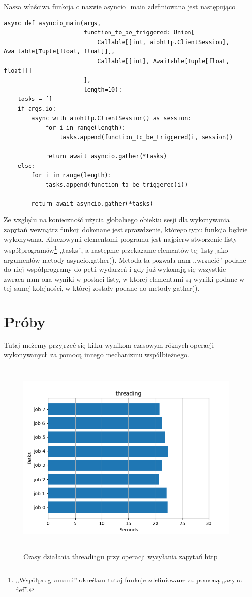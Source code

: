 Nasza właściwa funkcja o nazwie asyncio\_main zdefiniowana jest następująco:
\begin{lstlisting}
async def asyncio_main(args,
                       function_to_be_triggered: Union[
                           Callable[[int, aiohttp.ClientSession], Awaitable[Tuple[float, float]]],
                           Callable[[int], Awaitable[Tuple[float, float]]]
                       ],
                       length=10):
    tasks = []
    if args.io:
        async with aiohttp.ClientSession() as session:
            for i in range(length):
                tasks.append(function_to_be_triggered(i, session))

            return await asyncio.gather(*tasks)
    else:
        for i in range(length):
            tasks.append(function_to_be_triggered(i))

        return await asyncio.gather(*tasks)
\end{lstlisting}
Ze względu na konieczność użycia globalnego obiektu sesji dla wykonywania zapytań wewnątrz funkcji dokonane jest sprawdzenie, którego typu funkcja będzie wykonywana. Kluczowymi elementami programu jest najpierw stworzenie listy współprogramów\footnote{,,Współprogramami'' określam tutaj funkcje zdefiniowane za pomocą ,,async def''.} ,,tasks'', a następnie przekazanie elementów tej listy jako argumentów metody asyncio.gather(). Metoda ta pozwala nam ,,wrzucić'' podane do niej współprogramy do pętli wydarzeń i gdy już wykonają się wszystkie zwraca nam ona wyniki w postaci listy, w ktorej elementami są wyniki podane w tej samej kolejności, w której zostały podane do metody gather().

\section{Próby}
Tutaj możemy przyjrzeć się kilku wynikom czasowym różnych operacji wykonywanych za pomocą innego mechanizmu współbieżnego.
\begin{figure}[H]
    \includegraphics[height=100mm]{zdjecia/threading_requests}
    \caption{Czasy działania threadingu przy operacji wysyłania zapytań http}
\end{figure}

